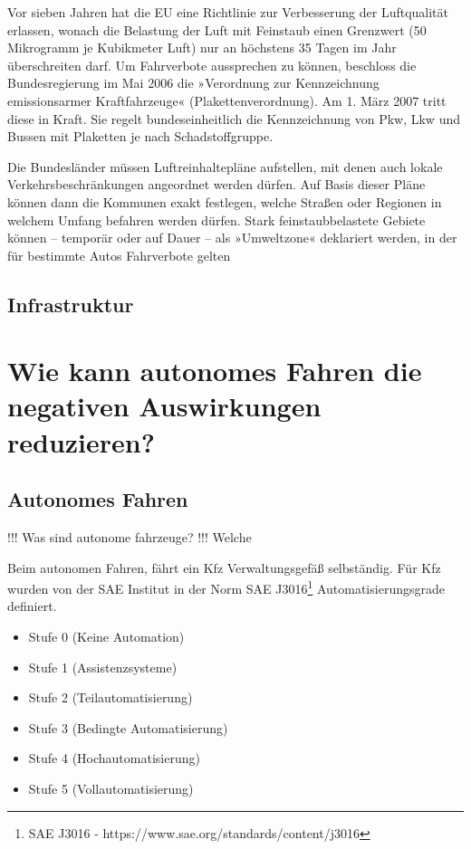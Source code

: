 Vor sieben Jahren hat die EU eine Richtlinie zur Verbesserung der Luftqualität erlassen, wonach die Belastung der Luft mit Feinstaub einen Grenzwert (50 Mikrogramm je Kubikmeter Luft) nur an höchstens 35 Tagen im Jahr überschreiten darf. Um Fahrverbote aussprechen zu können, beschloss die Bundesregierung im Mai 2006 die »Verordnung zur Kennzeichnung emissionsarmer Kraftfahrzeuge« (Plakettenverordnung). Am 1. März 2007 tritt diese in Kraft. Sie regelt bundeseinheitlich die Kennzeichnung von Pkw, Lkw und Bussen mit Plaketten je nach Schadstoffgruppe.

Die Bundesländer müssen Luftreinhaltepläne aufstellen, mit denen auch lokale Verkehrsbeschränkungen angeordnet werden dürfen. Auf Basis dieser Pläne können dann die Kommunen exakt festlegen, welche Straßen oder Regionen in welchem Umfang befahren werden dürfen. Stark feinstaubbelastete Gebiete können – temporär oder auf Dauer – als »Umweltzone« deklariert werden, in der für bestimmte Autos Fahrverbote gelten

\subsection{Infrastruktur}



\section{Wie kann autonomes Fahren die negativen Auswirkungen reduzieren?}


\subsection{Autonomes Fahren}

!!! Was sind autonome fahrzeuge?
!!! Welche 


Beim autonomen Fahren, fährt ein \ac{Kfz} Verwaltungsgefäß selbständig.
Für \ac{Kfz} wurden von der \ac{SAE} Institut in der Norm SAE J3016\footnote{SAE J3016 - https://www.sae.org/standards/content/j3016} Automatisierungsgrade definiert.
\begin{itemize}
	\item Stufe 0 (Keine Automation)
	\item Stufe 1 (Assistenzsysteme)
	\item Stufe 2 (Teilautomatisierung)
	\item Stufe 3 (Bedingte Automatisierung)
	\item Stufe 4 (Hochautomatisierung)
	\item Stufe 5 (Vollautomatisierung)
\end{itemize}
